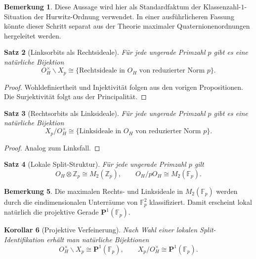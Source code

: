 \documentclass[a4paper,12pt]{article}
\newtheorem{satz}{Satz}[section]
\newtheorem{korollar}[satz]{Korollar}
\theoremstyle{definition}
\newtheorem{bemerkung}[satz]{Bemerkung}
\numberwithin{equation}{section}
\newcommand{\OH}{O_H}
\newcommand{\Z}{\mathbb{Z}}
\newcommand{\Fp}{\mathbb{F}_p}
\begin{document}
	\begin{bemerkung}
		Diese Aussage wird hier als Standardfaktum der Klassenzahl-\(1\)-Situation der Hurwitz-Ordnung verwendet. In einer ausführlicheren Fassung könnte dieser Schritt separat aus der Theorie maximaler Quaternionenordnungen hergeleitet werden.
	\end{bemerkung}
	
	\begin{satz}[Linksorbits als Rechtsideale]
		Für jede ungerade Primzahl \(p\) gibt es eine natürliche Bijektion
		\[
		\OH^\times\backslash X_p
		\cong
		\{\text{Rechtsideale in }\OH\text{ von reduzierter Norm }p\}.
		\]
	\end{satz}
	
	\begin{proof}
		Wohldefiniertheit und Injektivität folgen aus den vorigen Propositionen. Die Surjektivität folgt aus der Principalität.
	\end{proof}
	
	\begin{satz}[Rechtsorbits als Linksideale]
		Für jede ungerade Primzahl \(p\) gibt es eine natürliche Bijektion
		\[
		X_p/\OH^\times
		\cong
		\{\text{Linksideale in }\OH\text{ von reduzierter Norm }p\}.
		\]
	\end{satz}
	
	\begin{proof}
		Analog zum Linksfall.
	\end{proof}
	
	\begin{satz}[Lokale Split-Struktur]
		Für jede ungerade Primzahl \(p\) gilt
		\[
		\OH\otimes\Z_p\cong M_2(\Z_p),
		\qquad
		\OH/p\OH\cong M_2(\Fp).
		\]
	\end{satz}
	
	\begin{bemerkung}
		Die maximalen Rechts- und Linksideale in \(M_2(\Fp)\) werden durch die eindimensionalen Unterräume von \(\Fp^2\) klassifiziert. Damit erscheint lokal natürlich die projektive Gerade \(\mathbf P^1(\Fp)\).
	\end{bemerkung}
	
	\begin{korollar}[Projektive Verfeinerung]
		Nach Wahl einer lokalen Split-Identifikation erhält man natürliche Bijektionen
		\[
		\OH^\times\backslash X_p \cong \mathbf P^1(\Fp),
		\qquad
		X_p/\OH^\times \cong \mathbf P^1(\Fp).
		\]
	\end{korollar}
	
\end{document}
